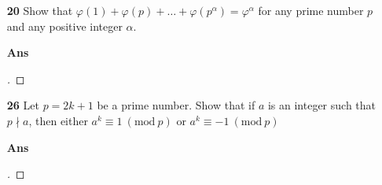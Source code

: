 \documentclass[paper=usletter, fontsize=12pt]{article}
\newcommand{\Mod}[1]{\ (\mathrm{mod}\ #1)}
\begin{document}
\begin{itemize}
\begin{itemize}
            \item[\textbf{20}] Show that
            $\varphi(1)+\varphi(p)+\ldots+\varphi(p^\alpha)=\varphi^\alpha$ for
            any prime number $p$ and any positive integer $\alpha$.
            \item[\textbf{Ans}]
            \begin{proof}[\unskip\nopunct]
            \end{proof}
            \vspace{0.2in}

            \item[\textbf{26}] Let $p=2k+1$ be a prime number. Show that if $a$
            is an integer such that $p \nmid a$, then either $a^k \equiv 1
            \Mod{p}$ or $a^k \equiv -1 \Mod{p}$
            \item[\textbf{Ans}]
            \begin{proof}[\unskip\nopunct]
            \end{proof}
            \vspace{0.2in}

        \end{itemize}

    \end{itemize}
\end{document}
